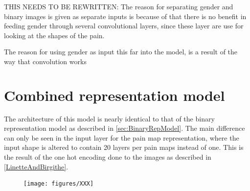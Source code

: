 THIS NEEDS TO BE REWRITTEN: The reason for separating gender and binary images is given as separate inputs is because of that there is no benefit in feeding gender through several convolutional layers, since these layer are use for looking at the shapes of the pain.  

The reason for using gender as input this far into the model, is a result of the way that convolution works 


\section{Combined representation model}\label{sec:CombinedRepModel}
The architecture of this model is nearly identical to that of the binary representation model as described in \ref{sec:BinaryRepModel}. 
The main difference can only be seen in the input layer for the pain map representation, where the input shape is altered to contain 20 layers per pain maps instead of one. 
This is the result of the one hot encoding done to the images as described in \autoref{LinetteAndBirgithe}. 

\begin{figure} [H]
\centering
\texttt{[image: figures/XXX]}
\caption{}
\label{fig:CombinedRepModel}  
\end{figure}
